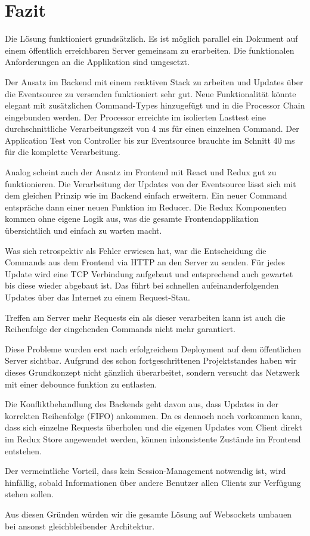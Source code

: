 \section{Fazit}

Die Lösung funktioniert grundsätzlich.
Es ist möglich parallel ein Dokument auf einem öffentlich erreichbaren Server gemeinsam zu erarbeiten.
Die funktionalen Anforderungen an die Applikation sind umgesetzt.

Der Ansatz im Backend mit einem reaktiven Stack zu arbeiten und Updates über die Eventsource zu versenden funktioniert sehr gut.
Neue Funktionalität könnte elegant mit zusätzlichen Command-Types hinzugefügt und in die Processor Chain eingebunden werden.
Der Processor erreichte im isolierten Lasttest eine durchschnittliche Verarbeitungszeit von 4 ms für einen einzelnen Command.
Der Application Test von Controller bis zur Eventsource brauchte im Schnitt 40 ms für die komplette Verarbeitung.

Analog scheint auch der Ansatz im Frontend mit React und Redux gut zu funktionieren.
Die Verarbeitung der Updates von der Eventsource lässt sich mit dem gleichen Prinzip wie im Backend einfach erweitern.
Ein neuer Command entspräche dann einer neuen Funktion im Reducer.
Die Redux Komponenten kommen ohne eigene Logik aus, was die gesamte Frontendapplikation übersichtlich und einfach zu warten macht.

Was sich retrospektiv als Fehler erwiesen hat, war die Entscheidung die Commands aus dem Frontend via HTTP an den Server zu senden.
Für jedes Update wird eine TCP Verbindung aufgebaut und entsprechend auch gewartet bis diese wieder abgebaut ist.
Das führt bei schnellen aufeinanderfolgenden Updates über das Internet zu einem Request-Stau.

Treffen am Server mehr Requests ein als dieser verarbeiten kann ist auch die Reihenfolge der eingehenden Commands nicht mehr garantiert.

Diese Probleme wurden erst nach erfolgreichem Deployment auf dem öffentlichen Server sichtbar.
Aufgrund des schon fortgeschrittenen Projektstandes haben wir dieses Grundkonzept nicht gänzlich überarbeitet, sondern versucht das Netzwerk mit einer debounce funktion zu entlasten.

Die Konfliktbehandlung des Backends geht davon aus, dass Updates in der korrekten Reihenfolge (FIFO) ankommen.
Da es dennoch noch vorkommen kann, dass sich einzelne Requests überholen und die eigenen Updates vom Client direkt im Redux Store angewendet werden, können inkonsistente Zustände im Frontend entstehen.

Der vermeintliche Vorteil, dass kein Session-Management notwendig ist, wird hinfällig, sobald Informationen über andere Benutzer allen Clients zur Verfügung stehen sollen.

Aus diesen Gründen würden wir die gesamte Lösung auf Websockets umbauen bei ansonst gleichbleibender Architektur.